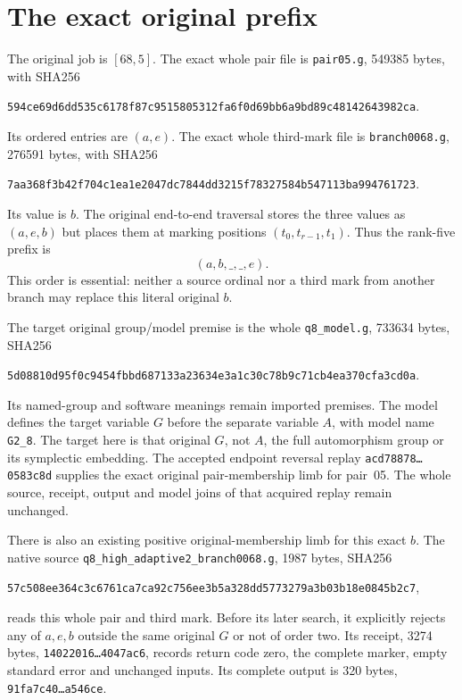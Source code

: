\documentclass[11pt]{article}
\begin{document}
\section{The exact original prefix}

The original job is $[68,5]$. The exact whole pair file is
\texttt{pair05.g}, 549385 bytes, with SHA256
\begin{center}\small
\texttt{594ce69d6dd535c6178f87c9515805312fa6f0d69bb6a9bd89c48142643982ca}.
\end{center}
Its ordered entries are $(a,e)$. The exact whole third-mark file is
\texttt{branch0068.g}, 276591 bytes, with SHA256
\begin{center}\small
\texttt{7aa368f3b42f704c1ea1e2047dc7844dd3215f78327584b547113ba994761723}.
\end{center}
Its value is $b$. The original end-to-end traversal stores the
three values as $(a,e,b)$ but places them at marking positions
$(t_0,t_{r-1},t_1)$. Thus the rank-five prefix is
\[
                              (a,b,\_,\_,e).
\]
This order is essential: neither a source ordinal nor a third mark
from another branch may replace this literal original $b$.

The target original group/model premise is the whole
\texttt{q8\_model.g}, 733634 bytes, SHA256
\begin{center}\small
\texttt{5d08810d95f0c9454fbbd687133a23634e3a1c30c78b9c71cb4ea370cfa3cd0a}.
\end{center}
Its named-group and software meanings remain imported premises. The
model defines the target variable $G$ before the separate variable
$A$, with model name \texttt{G2\_8}. The target here is that original
$G$, not $A$, the full automorphism group or its symplectic embedding.
The accepted endpoint reversal replay
\texttt{acd78878\ldots 0583c8d} supplies the exact original
pair-membership limb for pair~05. The whole source, receipt, output
and model joins of that acquired replay remain unchanged.

There is also an existing positive original-membership limb for this
exact $b$. The native source
\texttt{q8\_high\_adaptive2\_branch0068.g}, 1987 bytes,
SHA256
\begin{center}\small
\texttt{57c508ee364c3c6761ca7ca92c756ee3b5a328dd5773279a3b03b18e0845b2c7},
\end{center}
reads this whole pair and third mark. Before its later search, it
explicitly rejects any of $a,e,b$ outside the same original $G$ or
not of order two. Its receipt, 3274 bytes,
\texttt{14022016\ldots 4047ac6}, records return code zero, the
complete marker, empty standard error and unchanged inputs. Its
complete output is 320 bytes,
\texttt{91fa7c40\ldots a546ce}.
\end{document}
